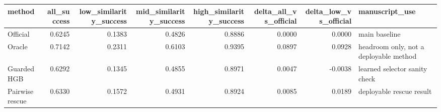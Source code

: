 \begin{tabular}{lrrrrrrl}
\toprule
method & all\_success & low\_similarity\_success & mid\_similarity\_success & high\_similarity\_success & delta\_all\_vs\_official & delta\_low\_vs\_official & manuscript\_use \\
\midrule
Official & 0.6245 & 0.1383 & 0.4826 & 0.8886 & 0.0000 & 0.0000 & main baseline \\
Oracle & 0.7142 & 0.2311 & 0.6103 & 0.9395 & 0.0897 & 0.0928 & headroom only, not a deployable method \\
Guarded HGB & 0.6292 & 0.1345 & 0.4855 & 0.8971 & 0.0047 & -0.0038 & learned selector sanity check \\
Pairwise rescue & 0.6330 & 0.1572 & 0.4931 & 0.8924 & 0.0085 & 0.0189 & deployable rescue result \\
\bottomrule
\end{tabular}
